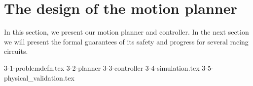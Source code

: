 \section{The design of the motion planner}
In this section, we present our motion planner and controller.
%
In the next section we will present the formal guarantees of its safety and progress for several racing circuits.

{3-1-problemdefn.tex}
{3-2-planner}
{3-3-controller}
{3-4-simulation.tex}
{3-5-physical_validation.tex}